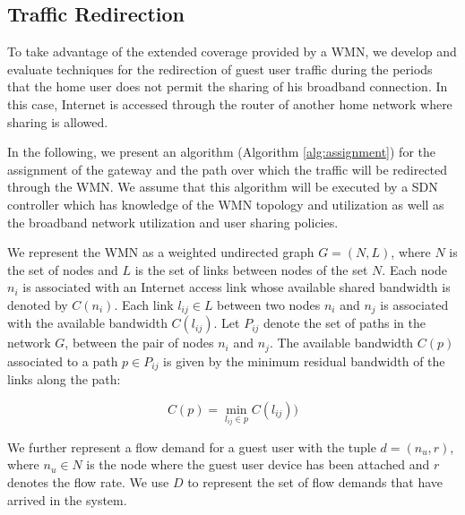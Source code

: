 \subsection{Traffic Redirection}
\label{architecture:redirection}

To take advantage of the extended coverage provided by a WMN, we develop and evaluate techniques for the redirection of guest user traffic during the periods that the home user does not permit the sharing of his broadband connection. In this case, Internet is accessed through the router of another home network where sharing is allowed. 

In the following, we present an algorithm (Algorithm \ref{alg:assignment}) for the assignment of the gateway and the path over which the traffic will be redirected through the WMN. We assume that this algorithm will be executed by a SDN controller which has knowledge of the WMN topology and utilization as well as the broadband network utilization and user sharing policies. 

We represent the WMN as a weighted undirected graph $G = (N, L)$, where $N$ is the set of nodes and $L$ is the set of links between nodes of the set $N$. Each node $n_i$ is associated with an Internet access link whose available shared bandwidth is denoted by $C(n_i)$. Each link $l_{ij} \in L$ between two nodes $n_i$ and $n_j$ is associated with the available bandwidth $C(l_{ij})$. Let $P_{ij}$ denote the set of paths in the network $G$, between the pair of nodes $n_i$ and $n_j$. The available bandwidth $C(p)$ associated to a path $p \in P_{ij}$ is given by the minimum residual bandwidth of the links along the path:

\begin{equation}
C(p) = \min_{l_{ij} \in p} C(l_{ij}))
\end{equation}

We further represent a flow demand for a guest user with the tuple $d = (n_u, r)$, where $n_u \in N$ is the node where the guest user device has been attached and $r$ denotes the flow rate. We use $D$ to represent the set of flow demands that have arrived in the system.

